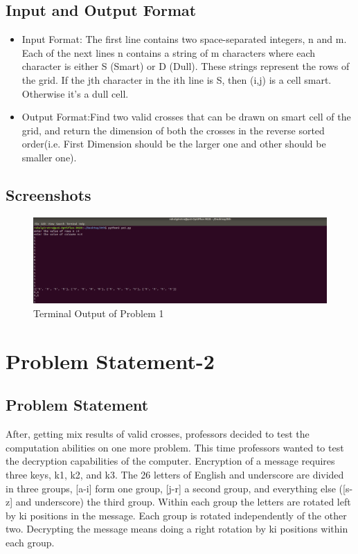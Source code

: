 \documentclass[12pt]{article}
\begin{document}
		\subsection{Input and Output Format}
		
			\begin{itemize}
				\item Input Format: The first line contains two space-separated integers,  n and m. 
Each of the next  lines n contains a string of  m characters where each character is either S (Smart) or D (Dull). These strings represent the rows of the grid. If the jth character in the ith  line is S, then  (i,j) is a  cell smart. Otherwise it's a  dull cell.
\\
				\item Output Format:Find two valid crosses that can be drawn on smart cell of the grid, and return the dimension of both the crosses in the reverse sorted order(i.e. First Dimension should be the larger one and other should be smaller one).\\ 
			\end{itemize}
		
		\subsection{Screenshots}
		
			\begin{figure}[h!]
				\centering
				\caption{Terminal Output of Problem 1}
				\includegraphics[scale=.5]{ps1s1.png}
			\end{figure}
	 
	\section{Problem Statement-2} \cite{problem2}
	
		\subsection{Problem Statement}
			After, getting mix results of valid crosses, professors decided to test the computation abilities on one more problem. This time professors wanted to test the decryption capabilities of the computer.
Encryption of  a message requires three keys, k1, k2, and k3. The 26 letters of English and underscore are divided in three groups,  [a-i] form one group, [j-r] a second group, and everything else ([s-z] and underscore) the third group. Within each group the letters are rotated left by ki positions in the message. Each group is rotated independently of the other two. Decrypting the message means doing a right rotation by ki positions within each group.
\end{document}

